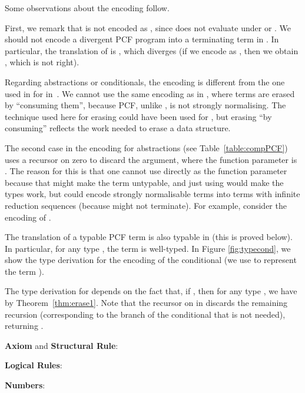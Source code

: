 \documentclass{article}
\begin{document}
Some observations about the encoding follow.

First, we remark that  is not encoded as 
, since 
does not evaluate under  or . We should not encode a
divergent PCF program into a terminating term in .
In particular, the translation of  is , which diverges (if we encode
 as , then we obtain , which is
not right).

Regarding abstractions or conditionals, the encoding is different from
the one used in for \ST in~\cite{AlvesS:TCS}. We cannot use the same
encoding as in \LLCI, where terms are erased by ``consuming them'',
because PCF, unlike \ST, is not strongly
normalising. The technique used here for erasing could have been used
for \LLCI, but erasing ``by consuming'' reflects the work needed to erase a data structure.

The second case in the encoding for abstractions (see
Table~\ref{table:compPCF}) uses a
recursor on zero to discard the argument, where the function parameter
is . The
reason for this is that one cannot use  directly as the function
parameter because that might make the term untypable, and just using
 would make the types work, but could encode
strongly normalisable terms into terms with infinite reduction
sequences (because  might not terminate). For
example, consider the encoding of .

The translation of a typable PCF term is also typable in \LLCIrec (this
is proved below).  In particular, for any type , the term
 is well-typed.
In Figure \ref{fig:typecond}, we show the type
derivation for the encoding of the conditional (we use  to represent
the term ).

\begin{figure*}[t!]

\caption{Type derivation for  }\label{fig:typecond}
\end{figure*}

The type derivation for  depends on the fact that, if , then for any type , we have  by Theorem~\ref{thm:erase1}. Note that the recursor on  in  discards the remaining recursion (corresponding to the branch of the
conditional that is not needed), returning .

\begin{table*}[t!]
{\bf Axiom} and {\bf Structural Rule}:


{\bf Logical Rules}:



{\bf Numbers}:



\caption{Typing rules for \LLCIrecX}\label{fig:typesX}
\end{table*}
\end{document}
